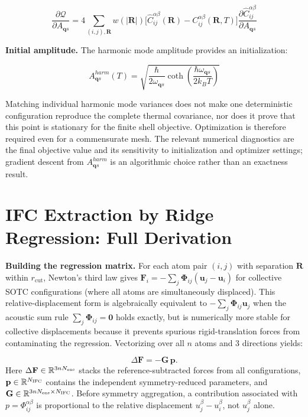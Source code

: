 \documentclass[aps,prb,reprint,amsmath,amssymb,floatfix]{revtex4-2}
\begin{document}
{\small
\begin{equation*}
\frac{\partial\mathcal{Q}}{\partial A_{\mathbf{q}s}} = 4\sum_{(i,j),\mathbf{R}} w(|\mathbf{R}|)\bigl[\hat{C}_{ij}^{\alpha\beta}(\mathbf{R}) - C_{ij}^{\alpha\beta}(\mathbf{R},T)\bigr]\frac{\partial\hat{C}_{ij}^{\alpha\beta}}{\partial A_{\mathbf{q}s}}
\end{equation*}
}

\color{revisionblue}
\textbf{Initial amplitude.} The harmonic mode amplitude provides an
initialization:
\color{black}

\begin{equation*}
A_{\mathbf{q}s}^{harm}(T) = \sqrt{\frac{\hbar}{2\omega_{\mathbf{q}s}}\coth\!\left(\frac{\hbar\omega_{\mathbf{q}s}}{2k_BT}\right)}
\end{equation*}

\color{revisionblue}
Matching individual harmonic mode variances does not make one deterministic
configuration reproduce the complete thermal covariance, nor does it prove
that this point is stationary for the finite shell objective. Optimization is therefore required even for a commensurate mesh. The relevant
numerical diagnostics are the final objective value and its sensitivity to
initialization and optimizer settings; gradient descent from
\(A_{\mathbf{q}s}^{harm}\) is an algorithmic choice rather than an exactness
result.
\color{black}

\section{IFC Extraction by Ridge Regression: Full
Derivation}\label{appendix-d-ifc-extraction-by-ridge-regression-full-derivation}

\textbf{Building the regression matrix.} For each atom pair \((i,j)\)
with separation \(\mathbf{R}\) within \(r_\text{cut}\), Newton's third
law gives
\(\mathbf{F}_i = -\sum_{j}\boldsymbol{\Phi}_{ij}(\mathbf{u}_j - \mathbf{u}_i)\)
for collective SOTC configurations (where all atoms are simultaneously
displaced). This relative-displacement form is algebraically equivalent
to \(-\sum_j\boldsymbol{\Phi}_{ij}\mathbf{u}_j\) when the acoustic sum
rule \(\sum_j\boldsymbol{\Phi}_{ij} = \mathbf{0}\) holds exactly, but is
numerically more stable for collective displacements because it prevents
spurious rigid-translation forces from contaminating the regression.
Vectorizing over all \(n\) atoms and 3 directions yields:

\color{revisionblue}
\begin{equation*}
\Delta\mathbf F=-\mathbf G\,\mathbf p .
\end{equation*}
Here \(\Delta\mathbf F\in\mathbb R^{3nN_{\rm ens}}\) stacks the
reference-subtracted forces from all configurations,
\(\mathbf p\in\mathbb R^{N_{\rm IFC}}\) contains the independent
symmetry-reduced parameters, and
\(\mathbf G\in\mathbb R^{3nN_{\rm ens}\times N_{\rm IFC}}\). Before
symmetry aggregation, a contribution associated with
\(p=\Phi_{ij}^{\alpha\beta}\) is proportional to the relative displacement
\(u_j^\beta-u_i^\beta\), not \(u_j^\beta\) alone.
\color{black}
\end{document}

